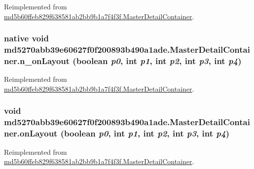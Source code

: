 Reimplemented from \hyperlink{classmd5b60ffeb829f638581ab2bb9b1a7f4f3f_1_1_master_detail_container_4bbf2f5847044e80a0b1b8e54eb8f621}{md5b60ffeb829f638581ab2bb9b1a7f4f3f.MasterDetailContainer}.\hypertarget{classmd5270abb39e60627f0f200893b490a1ade_1_1_master_detail_container_0582c744ccf98d251edbc86dec6b8feb}{
\subsubsection[{n\_\-onLayout}]{\setlength{\rightskip}{0pt plus 5cm}native void md5270abb39e60627f0f200893b490a1ade.MasterDetailContainer.n\_\-onLayout (boolean {\em p0}, \/  int {\em p1}, \/  int {\em p2}, \/  int {\em p3}, \/  int {\em p4})}}
\label{classmd5270abb39e60627f0f200893b490a1ade_1_1_master_detail_container_0582c744ccf98d251edbc86dec6b8feb}




Reimplemented from \hyperlink{classmd5b60ffeb829f638581ab2bb9b1a7f4f3f_1_1_master_detail_container_a4ea06195f50a84c96f5163df0e39faa}{md5b60ffeb829f638581ab2bb9b1a7f4f3f.MasterDetailContainer}.\hypertarget{classmd5270abb39e60627f0f200893b490a1ade_1_1_master_detail_container_f60c6a5b4b46f56b41eb0cd825f110de}{
\subsubsection[{onLayout}]{\setlength{\rightskip}{0pt plus 5cm}void md5270abb39e60627f0f200893b490a1ade.MasterDetailContainer.onLayout (boolean {\em p0}, \/  int {\em p1}, \/  int {\em p2}, \/  int {\em p3}, \/  int {\em p4})}}
\label{classmd5270abb39e60627f0f200893b490a1ade_1_1_master_detail_container_f60c6a5b4b46f56b41eb0cd825f110de}




Reimplemented from \hyperlink{classmd5b60ffeb829f638581ab2bb9b1a7f4f3f_1_1_master_detail_container_0ef2e1e3ab4836b6a210d6af09d780c6}{md5b60ffeb829f638581ab2bb9b1a7f4f3f.MasterDetailContainer}.

